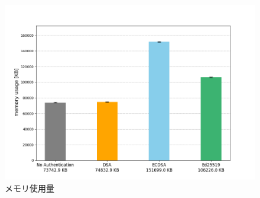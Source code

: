 \begin{figure}
  \centering
  \includegraphics[width=1\textwidth]{figures/memory_usages.png}
  \caption{メモリ使用量}
  \label{fig:memory_usages}
\end{figure}






